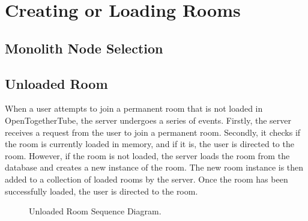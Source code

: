 \section{Creating or Loading Rooms}

\subsection{Monolith Node Selection}

\subsection{Unloaded Room}
When a user attempts to join a permanent room that is not loaded in OpenTogetherTube, the server undergoes a series of
 events. Firstly, the server receives a request from the user to join a permanent room. Secondly, it checks if the room 
 is currently loaded in memory, and if it is, the user is directed to the room. However, if the room is not loaded, the 
 server loads the room from the database and creates a new instance of the room. The new room instance is then added to a 
 collection of loaded rooms by the server. Once the room has been successfully loaded, the user is directed to the room.

 \begin{figure}[!htb]
  \centering
  \caption{\label{Figure::unloaded-room} Unloaded Room Sequence Diagram.}
\end{figure}